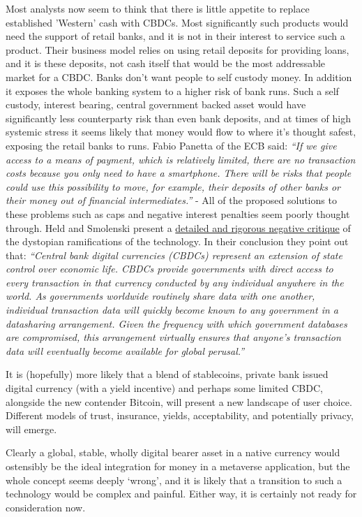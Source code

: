 Most analysts now seem to think that there is little appetite to replace established 'Western' cash with CBDCs. Most significantly such products would need the support of retail banks, and it is not in their interest to service such a product. Their business model relies on using retail deposits for providing loans, and it is these deposits, not cash itself that would be the most addressable market for a CBDC. Banks don't want people to self custody money. In addition it exposes the whole banking system to a higher risk of bank runs. Such a self custody, interest bearing, central government backed asset would have significantly less counterparty risk than even bank deposits, and at times of high systemic stress it seems likely that money would flow to where it's thought safest, exposing the retail banks to runs. Fabio Panetta of the ECB said: \textit{``If we give access to a means of payment, which is relatively limited, there are no transaction costs because you only need to have a smartphone. There will be risks that people could use this possibility to move, for example, their deposits of other banks or their money out of financial intermediates.''} - All of the proposed solutions to these problems such as caps and negative interest penalties seem poorly thought through.
Held and Smolenski present a \href{https://www.btcpolicy.org/articles/why-the-u-s-should-reject-central-bank-digital-currencies}{detailed and rigorous negative critique} of the dystopian ramifications of the technology. In their conclusion they point out that: \textit{``Central bank digital currencies (CBDCs) represent an extension of state control over economic life. CBDCs provide governments with direct access to every transaction in that currency conducted by any individual anywhere in the world. As governments worldwide routinely share data with one another, individual transaction data will quickly become known to any government in a datasharing arrangement. Given the frequency with which government databases are compromised, this arrangement virtually ensures that anyone’s transaction data will eventually become available for global perusal.''}\par
It is (hopefully) more likely that a blend of stablecoins, private bank issued digital currency (with a yield incentive) and perhaps some limited CBDC, alongside the new contender Bitcoin, will present a new landscape of user choice. Different models of trust, insurance, yields, acceptability, and potentially privacy, will emerge. \par
Clearly a global, stable, wholly digital bearer asset in a native currency would ostensibly be the ideal integration for money in a metaverse application, but the whole concept seems deeply `wrong', and it is likely that a transition to such a technology would be complex and painful. Either way, it is certainly not ready for consideration now.
